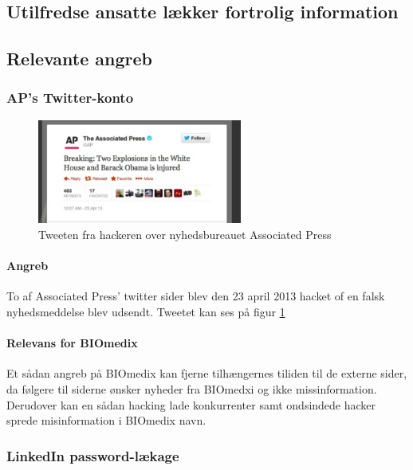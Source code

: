 \documentclass{article}
\begin{document}
\subsection{Utilfredse ansatte lækker fortrolig information}

\subsection{Relevante angreb}

\subsubsection{AP's Twitter-konto}

\begin{figure}
  \begin{center}
    \includegraphics[width=0.6\textwidth]{../Pictures/APTweet.jpg}
  \end{center}
  \caption{Tweeten fra hackeren over nyhedsbureauet Associated Press \cite{APTweetSource}}
  \label{fig:Tweet}
\end{figure}

\paragraph{Angreb}

To af Associated Press' twitter sider blev den 23 april 2013 hacket of en falsk nyhedsmeddelse blev udsendt. Tweetet kan ses på figur \ref{fig:Tweet}

\paragraph{Relevans for BIOmedix}

Et sådan angreb på BIOmedix kan fjerne tilhængernes tiliden til de externe sider, da følgere til siderne
ønsker nyheder fra BIOmedxi og ikke missinformation. Derudover kan en sådan hacking lade konkurrenter
samt ondsindede hacker sprede misinformation i BIOmedix navn. 

\subsubsection{LinkedIn password-lækage}
\end{document}
